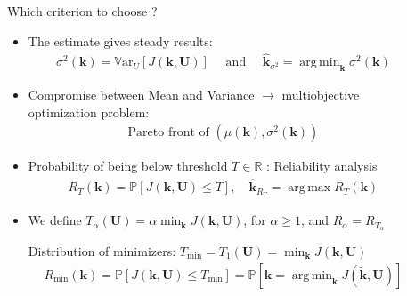 \documentclass{beamer}
\newlength{\sepwid}
\newlength{\sndcolwid}
\newcommand{\Var}{\mathbb{V}\mathrm{ar}}
\newcommand{\Prob}{\mathbb{P}}
\DeclareMathOperator*{\argmin}{arg\,min}
\DeclareMathOperator*{\argmax}{arg\,max}
\newcommand{\kest}{\hat{\bm{k}}}
\begin{document}
\begin{frame}[t]
\begin{columns}[t]
\begin{column}{\sndcolwid}
\begin{block}{Which criterion to choose ? \nocite{lehman_designing_2004}}
\begin{itemize}
 \item The estimate gives \alert{steady results}:
  \begin{align*}
    \sigma^2(\bm{k}) = \Var_U[J(\bm{k},\bm{U})] \quad\text{ and } \quad \kest_{\sigma^2} = \argmin_{\bm{k}} \sigma^2(\bm{k}) \tag{PCE gradient}
  \end{align*}

 
  \item \alert{Compromise} between Mean and Variance $\to$ multiobjective optimization problem:
  \begin{align*}
    \text{Pareto front of } (\mu(\bm{k}),\sigma^2(\bm{k})) \tag{Layered kriging}
  \end{align*}
\item\alert{Probability of being below threshold $T\in \mathbb{R}$} : Reliability analysis
  \begin{align*}
    R_T(\bm{k}) =  \Prob\left[J(\bm{k},\bm{U}) \leq T\right], \quad \kest_{R_T} = \argmax R_T(\bm{k}) \tag{GP simulations}
  \end{align*}


  
\item We define $T_{\alpha}(\bm{U}) = \alpha \min_{\bm{k}} J(\bm{k},\bm{U})$, for $\alpha \geq 1$, and $R_\alpha = R_{T_{\alpha}}$

 Distribution of minimizers: $T_{\min} = T_1(\bm{U})  = \min_{\bm{k}} J(\bm{k},\bm{U})$
  \begin{align*}
    R_{\min}(\bm{k}) = \Prob\left[J(\bm{k},\bm{U}) \leq T_{\min}\right] = \Prob\left[\bm{k} = \argmin_{\tilde{\bm{k}}} J(\tilde{\bm{k}},\bm{U}) \right] \tag{Estimation and maximization of density}
  \end{align*}

\end{itemize}
\end{block}
\end{column}

\begin{column}{\sepwid}\end{column} %
\begin{column}{\sndcolwid} %
 



\end{column}
\end{columns}
\end{frame}
\end{document}
